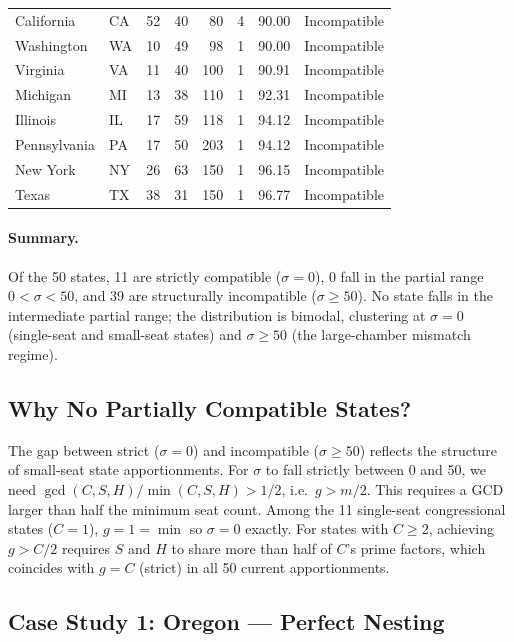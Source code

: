 \begin{longtable}{llrrrrrl}
California    & CA & 52 &  40 &  80 & 4 &  90.00 & Incompatible \\
Washington    & WA & 10 &  49 &  98 & 1 &  90.00 & Incompatible \\
Virginia      & VA & 11 &  40 & 100 & 1 &  90.91 & Incompatible \\
Michigan      & MI & 13 &  38 & 110 & 1 &  92.31 & Incompatible \\
Illinois      & IL & 17 &  59 & 118 & 1 &  94.12 & Incompatible \\
Pennsylvania  & PA & 17 &  50 & 203 & 1 &  94.12 & Incompatible \\
New York      & NY & 26 &  63 & 150 & 1 &  96.15 & Incompatible \\
Texas         & TX & 38 &  31 & 150 & 1 &  96.77 & Incompatible \\
\end{longtable}

\paragraph{Summary.}  Of the 50 states, 11 are strictly compatible ($\sigma = 0$),
0 fall in the partial range $0 < \sigma < 50$, and 39 are structurally
incompatible ($\sigma \geq 50$).  No state falls in the intermediate partial
range; the distribution is bimodal, clustering at $\sigma = 0$ (single-seat
and small-seat states) and $\sigma \geq 50$ (the large-chamber mismatch regime).

\subsection{Why No Partially Compatible States?}

The gap between strict ($\sigma = 0$) and incompatible ($\sigma \geq 50$)
reflects the structure of small-seat state apportionments.  For $\sigma$ to
fall strictly between 0 and 50, we need $\gcd(C,S,H)/\min(C,S,H) > 1/2$,
i.e.\ $g > m/2$.  This requires a GCD larger than half the minimum seat count.
Among the 11 single-seat congressional states ($C = 1$), $g = 1 = \min$
so $\sigma = 0$ exactly.  For states with $C \geq 2$, achieving $g > C/2$
requires $S$ and $H$ to share more than half of $C$'s prime factors, which
coincides with $g = C$ (strict) in all 50 current apportionments.

\subsection{Case Study 1: Oregon --- Perfect Nesting}

